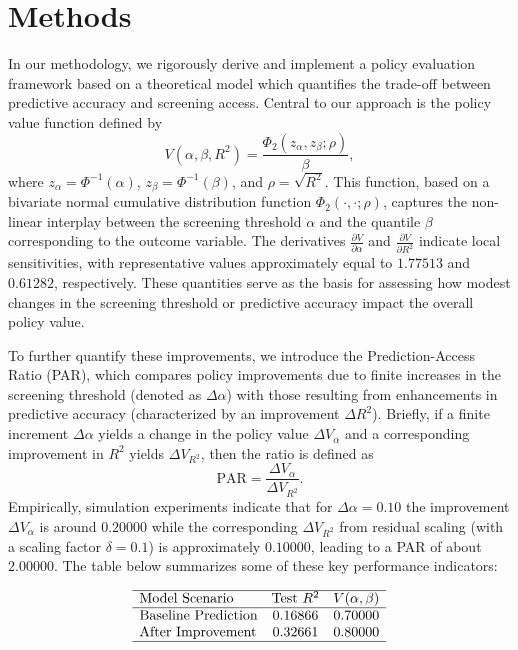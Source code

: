 \documentclass{article} %
\begin{document}
\section{Methods}
In our methodology, we rigorously derive and implement a policy evaluation framework based on a theoretical model which quantifies the trade-off between predictive accuracy and screening access. Central to our approach is the policy value function defined by
\[
V(\alpha,\beta,R^2) = \frac{\Phi_2(z_\alpha, z_\beta; \rho)}{\beta},
\]
where \(z_\alpha = \Phi^{-1}(\alpha)\), \(z_\beta = \Phi^{-1}(\beta)\), and \(\rho = \sqrt{R^2}\). This function, based on a bivariate normal cumulative distribution function \(\Phi_2(\cdot, \cdot; \rho)\), captures the non-linear interplay between the screening threshold \(\alpha\) and the quantile \(\beta\) corresponding to the outcome variable. The derivatives \(\frac{\partial V}{\partial \alpha}\) and \(\frac{\partial V}{\partial R^2}\) indicate local sensitivities, with representative values approximately equal to \(1.77513\) and \(0.61282\), respectively. These quantities serve as the basis for assessing how modest changes in the screening threshold or predictive accuracy impact the overall policy value.

To further quantify these improvements, we introduce the Prediction-Access Ratio (PAR), which compares policy improvements due to finite increases in the screening threshold (denoted as \(\Delta \alpha\)) with those resulting from enhancements in predictive accuracy (characterized by an improvement \(\Delta R^2\)). Briefly, if a finite increment \(\Delta \alpha\) yields a change in the policy value \(\Delta V_\alpha\) and a corresponding improvement in \(R^2\) yields \(\Delta V_{R^2}\), then the ratio is defined as
\[
\text{PAR} = \frac{\Delta V_\alpha}{\Delta V_{R^2}}.
\]
Empirically, simulation experiments indicate that for \(\Delta \alpha = 0.10\) the improvement \(\Delta V_\alpha\) is around \(0.20000\) while the corresponding \(\Delta V_{R^2}\) from residual scaling (with a scaling factor \(\delta = 0.1\)) is approximately \(0.10000\), leading to a PAR of about \(2.00000\). The table below summarizes some of these key performance indicators:

\[
\begin{array}{lcc}
\hline
\text{Model Scenario} & \text{Test } R^2 & V(\alpha,\beta) \\
\hline
\text{Baseline Prediction} & 0.16866 & 0.70000 \\
\text{After Improvement} & 0.32661 & 0.80000 \\
\hline
\end{array}
\]
\end{document}
